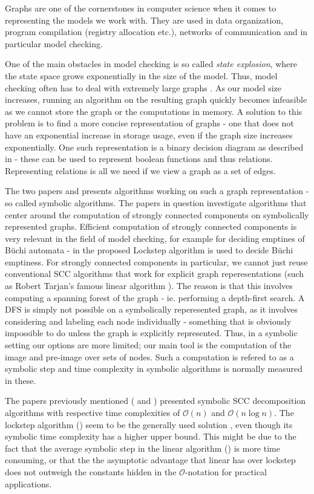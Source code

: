 \documentclass[../master/master.tex]{subfiles}
\begin{document}
Graphs are one of the cornerstones in computer science when it comes to representing the models we work with. They are used in data organization,  program compilation (registry allocation etc.), networks of communication and in particular model checking.

One of the main obstacles in model checking is so called \textit{state explosion}, where the state space grows exponentially in the size of the model. Thus, model checking often has to deal with extremely large graphs \cite{pelanek_2004}. As our model size increases, running an algorithm on the resulting graph quickly becomes infeasible as we cannot store the graph or the computations in memory. A solution to this problem is to find a more concise representation of graphs - one that does not have an exponential increase in storage usage, even if the graph size increases exponentially. One such representation is a binary decision diagram as described in \cite{bryant_1992} - these can be used to represent boolean functions and thus relations. Representing relations is all we need if we view a graph as a set of edges.

The two papers \cite{linear} and \cite{lockstep} presents algorithms working on such a graph representation - so called symbolic algorithms. The papers in question investigate algorithms that center around the computation of strongly connected components on symbolically represented graphs. Efficient computation of strongly connected components is very relevant in the field of model checking, for example for deciding emptines of Büchi automata - in \cite{lockstep} the proposed Lockstep algorithm is used to decide Büchi emptiness.  For strongly connected components in particular, we cannot just reuse conventional SCC algorithms that work for explicit graph reperesentations (such as Robert Tarjan's famous linear algorithm \cite{tarjan_1971}). The reason is that this involves computing a spanning forest of the graph - ie. performing a depth-first search. A DFS is simply not possible on a symbolically reperesented graph, as it involves considering and labeling each node individually - something that is obviously impossible to do unless the graph is explicitly represented. Thus, in a symbolic setting our options are more limited; our main tool is the computation of the image and pre-image over sets of nodes. Such a computation is refered to as a symbolic step and time complexity in symbolic algorithms is normally measured in these.

The papers previously mentioned (\cite{linear} and \cite{lockstep}) presented symbolic SCC decomposition algorithms with respective time complexities of $\mathcal{O}(n)$ and  $\mathcal{O}(n \log n)$. The lockstep algorithm (\cite{lockstep}) seem to be the generally used solution , even though its symbolic time complexity has a higher upper bound. This might be due to the fact that the average symbolic step in the linear algorithm (\cite{linear}) is more time consuming, or that the the asymptotic advantage that linear has over lockstep does not outweigh the constants hidden in the $\mathcal{O} $-notation for practical applications.
\end{document}
